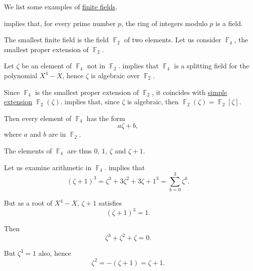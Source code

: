 \begin{example}\label{ex:def:finite_field}
  We list some examples of \hyperref[def:finite_field]{finite fields}.
  \begin{thmenum}
      implies that, for every prime number \( p \), the ring of integers modulo \( p \) is a field.

     The smallest finite field is the field \( \BbbF_2 \) of two elements. Let us consider \( \BbbF_4 \), the smallest proper extension of \( \BbbF_2 \).

    Let \( \zeta \) be an element of \( \BbbF_4 \) not in \( \BbbF_2 \).  implies that \( \BbbF_4 \) is a splitting field for the polynomial \( X^4 - X \), hence \( \zeta \) is algebraic over \( \BbbF_2 \).

    Since \( \BbbF_4 \) is the smallest proper extension of \( \BbbF_2 \), it coincides with \hyperref[def:simple_extension]{simple extension} \( \BbbF_2(\zeta) \).  implies that, since \( \zeta \) is algebraic, then \( \BbbF_2(\zeta) = \BbbF_2[\zeta] \).

    Then every element of \( \BbbF_4 \) has the form
    \begin{equation*}
      a \zeta + b,
    \end{equation*}
    where \( a \) and \( b \) are in \( \BbbF_2 \).

    The elements of \( \BbbF_4 \) are thus \( 0 \), \( 1 \), \( \zeta \) and \( \zeta + 1 \).

    Let us examine arithmetic in \( \BbbF_4 \).  implies that
    \begin{equation*}
      (\zeta + 1)^3 = \zeta^3 + 3\zeta^2 + 3\zeta + 1^3 = \sum_{k=0}^3 \zeta^k.
    \end{equation*}

    But as a root of \( X^4 - X \), \( \zeta + 1 \) satisfies
    \begin{equation*}
      (\zeta + 1)^3 = 1.
    \end{equation*}

    Then
    \begin{equation*}
      \zeta^3 + \zeta^2 + \zeta = 0.
    \end{equation*}

    But \( \zeta^3 = 1 \) also, hence
    \begin{equation}\label{eq:ex:def:finite_field/f4/minimal/characteristic}
      \zeta^2 = -(\zeta + 1) = \zeta + 1.
    \end{equation}


\end{thmenum}
\end{example}

